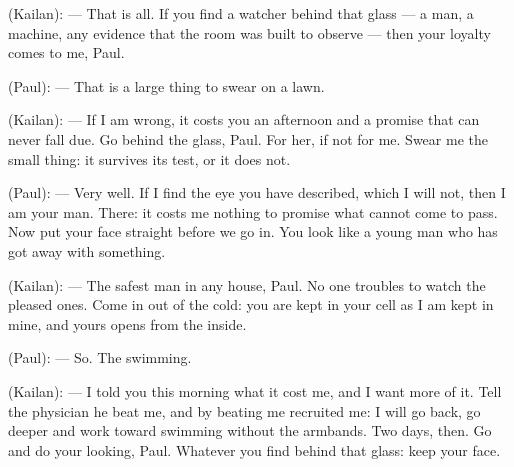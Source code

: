 \begin{room}
(Kailan): --- That is all. If you find a watcher behind that glass --- a man, a machine, any evidence that the room was built to observe --- then your loyalty comes to me, Paul.

(Paul): --- That is a large thing to swear on a lawn.

(Kailan): --- If I am wrong, it costs you an afternoon and a promise that can never fall due. Go behind the glass, Paul. For her, if not for me. Swear me the small thing: it survives its test, or it does not.

(Paul): --- Very well. If I find the eye you have described, which I will not, then I am your man. There: it costs me nothing to promise what cannot come to pass. Now put your face straight before we go in. You look like a young man who has got away with something.

(Kailan): --- The safest man in any house, Paul. No one troubles to watch the pleased ones. Come in out of the cold: you are kept in your cell as I am kept in mine, and yours opens from the inside.

(Paul): --- So. The swimming.

(Kailan): --- I told you this morning what it cost me, and I want more of it. Tell the physician he beat me, and by beating me recruited me: I will go back, go deeper and work toward swimming without the armbands. Two days, then. Go and do your looking, Paul. Whatever you find behind that glass: keep your face.

\end{room}
